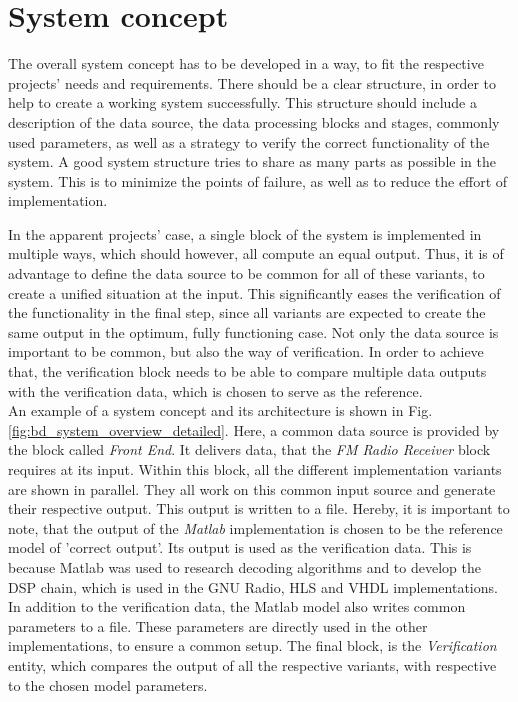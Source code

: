 \section{System concept}

The overall system concept has to be developed in a way, to fit the respective projects' needs and requirements.
There should be a clear structure, in order to help to create a working system successfully.
This structure should include a description of the data source, the data processing blocks and stages, commonly used parameters, as well as a strategy to verify the correct functionality of the system.
A good system structure tries to share as many parts as possible in the system.
This is to minimize the points of failure, as well as to reduce the effort of implementation.

In the apparent projects' case, a single block of the system is implemented in multiple ways, which should however, all compute an equal output.
Thus, it is of advantage to define the data source to be common for all of these variants, to create a unified situation at the input.
This significantly eases the verification of the functionality in the final step, since all variants are expected to create the same output in the optimum, fully functioning case.
Not only the data source is important to be common, but also the way of verification.
In order to achieve that, the verification block needs to be able to compare multiple data outputs with the verification data, which is chosen to serve as the reference.\\

An example of a system concept and its architecture is shown in Fig.\ref{fig:bd_system_overview_detailed}.
Here, a common data source is provided by the block called \textit{Front End}.
It delivers data, that the \textit{FM Radio Receiver} block requires at its input.
Within this block, all the different implementation variants are shown in parallel.
They all work on this common input source and generate their respective output.
This output is written to a file.
Hereby, it is important to note, that the output of the \textit{Matlab} implementation is chosen to be the reference model of 'correct output'.
Its output is used as the verification data.
This is because Matlab was used to research decoding algorithms and to develop the DSP chain, which is used in the GNU Radio, HLS and VHDL implementations.
In addition to the verification data, the Matlab model also writes common parameters to a file.
These parameters are directly used in the other implementations, to ensure a common setup.
The final block, is the \textit{Verification} entity, which compares the output of all the respective variants, with respective to the chosen model parameters.

